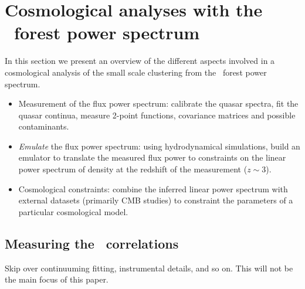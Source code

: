 \section{Cosmological analyses with the \lya\ forest power spectrum}
\label{sec:over}

In this section we present an overview of the different aspects involved in 
a cosmological analysis of the small scale clustering from the \lya\ forest
power spectrum.

\begin{itemize}
 \item Measurement of the flux power spectrum: calibrate the quasar spectra, 
  fit the quasar continua, measure 2-point functions, covariance matrices 
  and possible contaminants.
 \item \textit{Emulate} the flux power spectrum: using hydrodynamical 
  simulations, build an emulator to translate the measured flux power to 
  constraints on the linear power spectrum of density at the redshift of 
  the measurement ($z \sim 3$).
 \item Cosmological constraints: combine the inferred linear power spectrum
  with external datasets (primarily CMB studies) to constraint the parameters
  of a particular cosmological model.
\end{itemize}


\subsection{Measuring the \lya\ correlations}

Skip over continuuming fitting, instrumental details, and so on.
This will not be the main focus of this paper.

